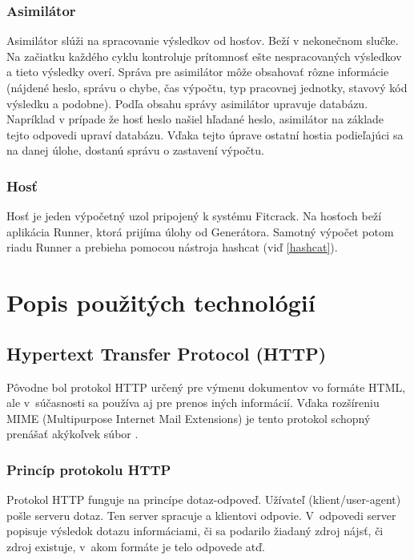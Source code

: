 \documentclass[slovak]{fitthesis}
\begin{document}
\subsection{Asimilátor}
Asimilátor slúži na spracovanie výsledkov od hosťov. Beží v nekonečnom slučke. Na začiatku každého cyklu kontroluje prítomnosť ešte nespracovaných výsledkov a tieto výsledky overí. Správa pre asimilátor môže obsahovať rôzne informácie (nájdené heslo, správu o chybe, čas výpočtu, typ pracovnej jednotky, stavový kód výsledku a podobne). Podľa obsahu správy asimilátor upravuje databázu. Napríklad v prípade že hosť heslo našiel hľadané heslo, asimilátor na základe tejto odpovedi upraví databázu. Vďaka tejto úprave ostatní hostia podieľajúci sa na danej úlohe, dostanú správu o zastavení výpočtu.

\subsection{Hosť}
Hosť je jeden výpočetný uzol pripojený k systému Fitcrack. Na hosťoch beží aplikácia Runner, ktorá prijíma úlohy od Generátora. Samotný výpočet potom riadu Runner a prebieha pomocou nástroja hashcat (viď \ref{hashcat}).






\chapter{Popis použitých technológií}\label{technologie}


\section{Hypertext Transfer Protocol (HTTP)}\label{http}
Pôvodne bol protokol HTTP určený pre výmenu dokumentov vo formáte HTML, ale v~súčasnosti sa používa aj pre prenos iných informácií. Vďaka rozšíreniu MIME (Multipurpose Internet Mail Extensions) je tento protokol schopný prenášať akýkoľvek súbor \cite{httpRFC}.

\subsection{Princíp protokolu HTTP}
Protokol HTTP funguje na princípe dotaz-odpoveď. Užívateľ (klient/user-agent) pošle serveru dotaz. Ten server spracuje a klientovi odpovie. V~odpovedi server popisuje výsledok dotazu informáciami, či sa podarilo žiadaný zdroj nájsť, či zdroj existuje, v~akom formáte je telo odpovede atď.
\end{document}
